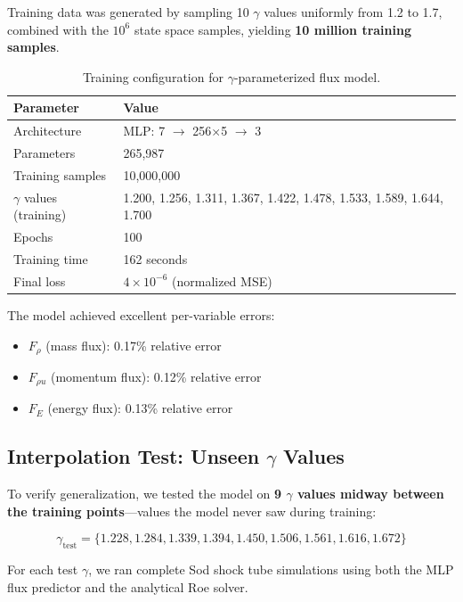 \documentclass[11pt,a4paper]{article}
\begin{document}
Training data was generated by sampling 10 $\gamma$ values uniformly from 1.2 to 1.7, combined with the $10^6$ state space samples, yielding \textbf{10 million training samples}.

\begin{table}[H]
\centering
\begin{tabular}{ll}
\toprule
Parameter & Value \\
\midrule
Architecture & MLP: 7 $\rightarrow$ 256$\times$5 $\rightarrow$ 3 \\
Parameters & 265,987 \\
Training samples & 10,000,000 \\
$\gamma$ values (training) & 1.200, 1.256, 1.311, 1.367, 1.422, 1.478, 1.533, 1.589, 1.644, 1.700 \\
Epochs & 100 \\
Training time & 162 seconds \\
Final loss & $4 \times 10^{-6}$ (normalized MSE) \\
\bottomrule
\end{tabular}
\caption{Training configuration for $\gamma$-parameterized flux model.}
\label{tab:gamma_training}
\end{table}

The model achieved excellent per-variable errors:
\begin{itemize}
    \item $F_\rho$ (mass flux): 0.17\% relative error
    \item $F_{\rho u}$ (momentum flux): 0.12\% relative error
    \item $F_E$ (energy flux): 0.13\% relative error
\end{itemize}

\subsection{Interpolation Test: Unseen $\gamma$ Values}

To verify generalization, we tested the model on \textbf{9 $\gamma$ values midway between the training points}---values the model never saw during training:

\begin{equation}
    \gamma_{\text{test}} = \{1.228, 1.284, 1.339, 1.394, 1.450, 1.506, 1.561, 1.616, 1.672\}
\end{equation}

For each test $\gamma$, we ran complete Sod shock tube simulations using both the MLP flux predictor and the analytical Roe solver.
\end{document}
